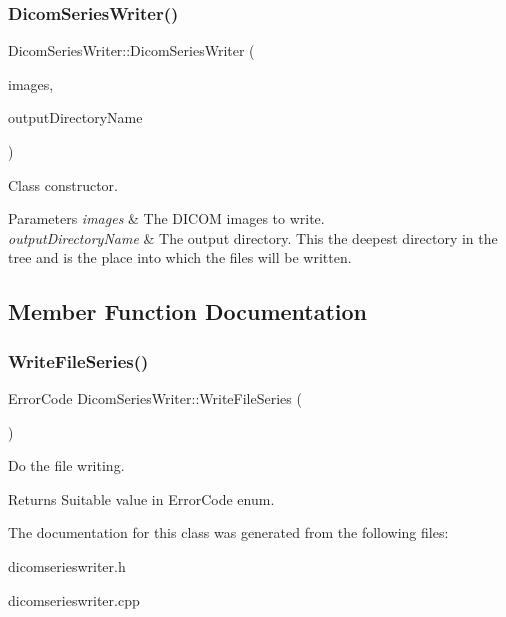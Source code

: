 \subsubsection{\texorpdfstring{Dicom\+Series\+Writer()}{DicomSeriesWriter()}}
{\footnotesize\ttfamily Dicom\+Series\+Writer\+::\+Dicom\+Series\+Writer (\begin{DoxyParamCaption}\item[{Q\+Vector$<$ Image2\+D\+Type\+::\+Pointer $>$ \&}]{images,  }\item[{const Q\+String \&}]{output\+Directory\+Name }\end{DoxyParamCaption})\hspace{0.3cm}{\ttfamily [explicit]}}



Class constructor. 


\begin{DoxyParams}{Parameters}
{\em images} & The D\+I\+C\+OM images to write. \\
\hline
{\em output\+Directory\+Name} & The output directory. This the deepest directory in the tree and is the place into which the files will be written. \\
\hline
\end{DoxyParams}


\subsection{Member Function Documentation}
\mbox{\label{class_dicom_series_writer_ade0edd641e1c84ed8659205c78d772e1}} 
\subsubsection{\texorpdfstring{Write\+File\+Series()}{WriteFileSeries()}}
{\footnotesize\ttfamily Error\+Code Dicom\+Series\+Writer\+::\+Write\+File\+Series (\begin{DoxyParamCaption}{ }\end{DoxyParamCaption})}



Do the file writing. 

\begin{DoxyReturn}{Returns}
Suitable value in Error\+Code enum. 
\end{DoxyReturn}


The documentation for this class was generated from the following files\+:\begin{DoxyCompactItemize}
\item 
dicomserieswriter.\+h\item 
dicomserieswriter.\+cpp\end{DoxyCompactItemize}
